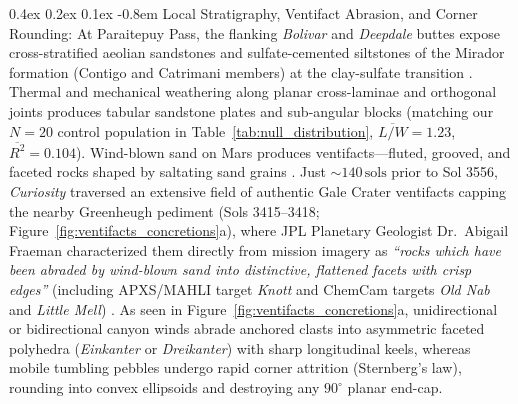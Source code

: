 \documentclass[11pt,a4paper]{article}
\makeatletter
\renewcommand\paragraph{\@startsection{paragraph}{4}{\z@}%
                                    {0.4ex \@plus 0.2ex \@minus 0.1ex}%
                                    {-0.8em}%
                                    {\normalfont\normalsize\bfseries}}
\makeatother
\begin{document}
\paragraph{Local Stratigraphy, Ventifact Abrasion, and Corner Rounding:} At Paraitepuy Pass, the flanking \textit{Bolivar} and \textit{Deepdale} buttes expose cross-stratified aeolian sandstones and sulfate-cemented siltstones of the Mirador formation (Contigo and Catrimani members) at the clay-sulfate transition \cite{rapin2023,roberts2025,roberts2026}. Thermal and mechanical weathering along planar cross-laminae and orthogonal joints produces tabular sandstone plates and sub-angular blocks (matching our $N = 20$ control population in Table~\ref{tab:null_distribution}, $\overline{L/W} = 1.23$, $\overline{R^2} = 0.104$). Wind-blown sand on Mars produces ventifacts---fluted, grooved, and faceted rocks shaped by saltating sand grains \cite{bridges2014,laity2009}. Just $\sim 140\,\text{sols}$ prior to Sol 3556, \textit{Curiosity} traversed an extensive field of authentic Gale Crater ventifacts capping the nearby Greenheugh pediment (Sols 3415--3418; Figure~\ref{fig:ventifacts_concretions}a), where JPL Planetary Geologist Dr.~Abigail Fraeman characterized them directly from mission imagery as \textit{``rocks which have been abraded by wind-blown sand into distinctive, flattened facets with crisp edges''} (including APXS/MAHLI target \textit{Knott} and ChemCam targets \textit{Old Nab} and \textit{Little Mell}) \cite{fraeman2022}. As seen in Figure~\ref{fig:ventifacts_concretions}a, unidirectional or bidirectional canyon winds abrade anchored clasts into asymmetric faceted polyhedra (\textit{Einkanter} or \textit{Dreikanter}) with sharp longitudinal keels, whereas mobile tumbling pebbles undergo rapid corner attrition (Sternberg's law), rounding into convex ellipsoids and destroying any $90^\circ$ planar end-cap.
\end{document}
